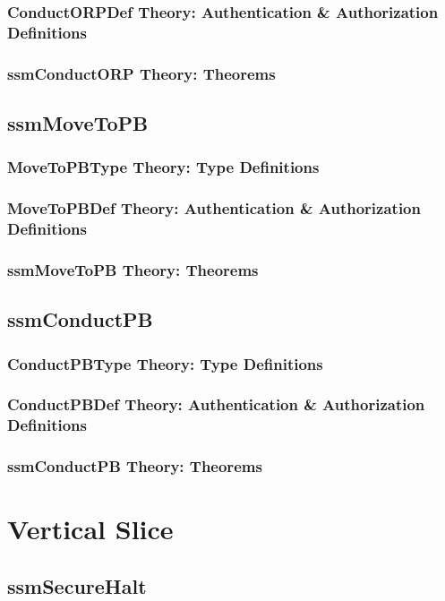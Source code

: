 \documentclass[hidelinks,12pt,a4paper]{report}
\begin{document}
\begin{appendices}
\subsubsection{ConductORPDef Theory: Authentication \& Authorization Definitions}
\subsubsection{ssmConductORP Theory: Theorems}

\subsection{ssmMoveToPB}
\subsubsection{MoveToPBType Theory: Type Definitions}
\subsubsection{MoveToPBDef Theory: Authentication \& Authorization Definitions}
\subsubsection{ssmMoveToPB Theory: Theorems}

\subsection{ssmConductPB}
\subsubsection{ConductPBType Theory: Type Definitions}
\subsubsection{ConductPBDef Theory: Authentication \& Authorization Definitions}
\subsubsection{ssmConductPB Theory: Theorems}


\section{Vertical Slice}
\subsection{ssmSecureHalt}

\end{appendices}
\end{document}

